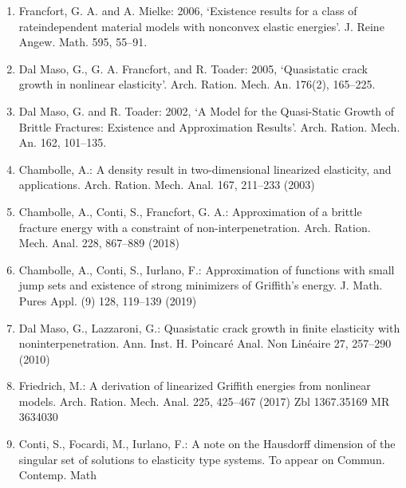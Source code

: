 \begin{enumerate}
\item Francfort, G. A. and A. Mielke: 2006, ‘Existence results for a class of rateindependent material models with nonconvex elastic energies’. J. Reine Angew.
Math. 595, 55–91.
\item Dal Maso, G., G. A. Francfort, and R. Toader: 2005, ‘Quasistatic crack growth in nonlinear elasticity’. Arch. Ration. Mech. An. 176(2), 165–225.
\item Dal Maso, G. and R. Toader: 2002, ‘A Model for the Quasi-Static Growth of Brittle Fractures: Existence and Approximation Results’. Arch. Ration. Mech. An. 162,
101–135.
\item  Chambolle, A.: A density result in two-dimensional linearized elasticity, and applications.
Arch. Ration. Mech. Anal. 167, 211–233 (2003)
\item Chambolle, A., Conti, S., Francfort, G. A.: Approximation of a brittle fracture energy
with a constraint of non-interpenetration. Arch. Ration. Mech. Anal. 228, 867–889 (2018)
\item Chambolle, A., Conti, S., Iurlano, F.: Approximation of functions with small jump sets and
existence of strong minimizers of Griffith’s energy. J. Math. Pures Appl. (9) 128, 119–139
(2019) 
\item  Dal Maso, G., Lazzaroni, G.: Quasistatic crack growth in finite elasticity with noninterpenetration. Ann. Inst. H. Poincaré Anal. Non Linéaire 27, 257–290 (2010)
\item  Friedrich, M.: A derivation of linearized Griffith energies from nonlinear models. Arch. Ration. Mech. Anal. 225, 425–467 (2017) Zbl 1367.35169 MR 3634030
\item Conti, S., Focardi, M., Iurlano, F.: A note on the Hausdorff dimension of the singular set of solutions to elasticity type systems. To appear on Commun. Contemp. Math
\end{enumerate}
